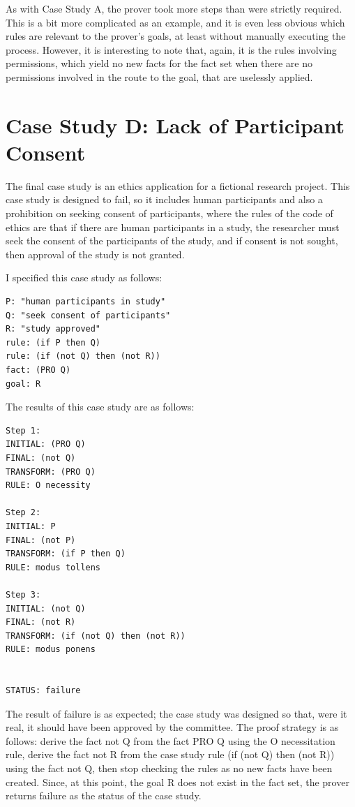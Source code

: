 \documentclass{l4proj}
\begin{document}
As with Case Study A, the prover took more steps than were strictly required. This is a bit more complicated as an example, and it is even less obvious which rules are relevant to the prover's goals, at least without manually executing the process. However, it is interesting to note that, again, it is the rules involving permissions, which yield no new facts for the fact set when there are no permissions involved in the route to the goal, that are uselessly applied. 

\section{Case Study D: Lack of Participant Consent}
The final case study is an ethics application for a fictional research project. This case study is designed to fail, so it includes human participants and also a prohibition on seeking consent of participants, where the rules of the code of ethics are that if there are human participants in a study, the researcher must seek the consent of the participants of the study, and if consent is not sought, then approval of the study is not granted. 

I specified this case study as follows: 
\begin{verbatim}
P: "human participants in study" 
Q: "seek consent of participants"
R: "study approved"
rule: (if P then Q)
rule: (if (not Q) then (not R))
fact: (PRO Q)
goal: R
\end{verbatim}

The results of this case study are as follows: 
\begin{verbatim}
Step 1: 
INITIAL: (PRO Q)
FINAL: (not Q)
TRANSFORM: (PRO Q)
RULE: O necessity

Step 2: 
INITIAL: P
FINAL: (not P)
TRANSFORM: (if P then Q)
RULE: modus tollens

Step 3: 
INITIAL: (not Q)
FINAL: (not R)
TRANSFORM: (if (not Q) then (not R))
RULE: modus ponens


STATUS: failure
\end{verbatim}
The result of failure is as expected; the case study was designed so that, were it real, it should have been approved by the committee. The proof strategy is as follows: derive the fact not Q from the fact PRO Q using the O necessitation rule, derive the fact not R from the case study rule (if (not Q) then (not R)) using the fact not Q, then stop checking the rules as no new facts have been created. Since, at this point, the goal R does not exist in the fact set, the prover returns failure as the status of the case study. 
\end{document}
